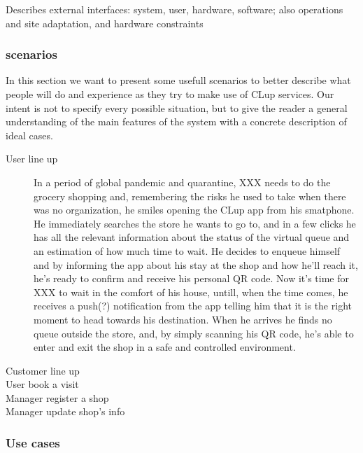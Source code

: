 Describes external interfaces: system, user, hardware, software; also operations and site adaptation, and hardware constraints

\subsubsection{scenarios}
\label{subsubsect:scenarios}

In this section we want to present some usefull scenarios to better describe what people will do and experience as they try to make use of CLup services. Our intent is not to specify every possible situation, but to give the reader a general understanding of the main features of the system with a concrete description of ideal cases.
 
\begin{description}
    \item[User line up] 
    In a period of global pandemic and quarantine, XXX needs to do the grocery shopping and, remembering the risks he used to take when there was no organization, he smiles opening the CLup app from his smatphone. He immediately searches the store he wants to go to, and in a few clicks he has all the relevant information about the status of the virtual queue and an estimation of how much time to wait. He decides to enqueue himself and by informing the app about his stay at the shop and how he'll reach it, he's ready to confirm and receive his personal QR code. Now it's time for XXX to wait in the comfort of his house, untill, when the time comes, he receives a push(?) notification from the app telling him that it is the right moment to head towards his destination. When he arrives he finds no queue outside the store, and, by simply scanning his QR code, he's able to enter and exit the shop in a safe and controlled environment.

    \item[Customer line up]
    \item[User book a visit]
    \item[Manager register a shop]
    \item[Manager update shop's info]   
\end{description}


\subsubsection{Use cases}
\label{subsubsect:usecases}

